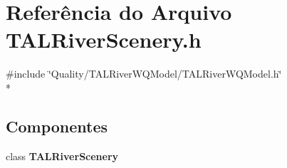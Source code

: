 \section{Referência do Arquivo T\+A\+L\+River\+Scenery.\+h}
\label{_t_a_l_river_scenery_8h}
{\ttfamily \#include \char`\"{}Quality/\+T\+A\+L\+River\+W\+Q\+Model/\+T\+A\+L\+River\+W\+Q\+Model.\+h\char`\"{}}\\*
\subsection*{Componentes}
\begin{DoxyCompactItemize}
\item 
class {\bf T\+A\+L\+River\+Scenery}
\end{DoxyCompactItemize}
